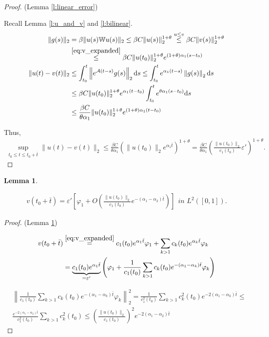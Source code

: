 \documentclass{article}
\renewcommand{\d}{\mathrm{d}}
\newcommand{\W}{\mathbb{W}}
\newcommand{\1}[1]{{\mathds{1}}_{\left\{#1\right\}}}
\newtheorem{lemma}{Lemma}
\begin{document}
\begin{proof}(Lemma \ref{l:linear_error})
	
	Recall Lemma \ref{l:u_and_v} and \ref{l:bilinear}.
	\begin{align}
		\nonumber
		\|g(s) \|_2&=\beta \|u(s) \W u(s) \|_2 \leq \beta C \| u(s)\|_2^{1+\theta} \overset{u \leq v}{\leq} \beta C \| v(s)\|_2^{1+\theta} \\
		\nonumber
		&\overset{\eqref{eq:v_expanded}}{\leq} \beta C \| u(t_0)\|_2^{1+\theta}e^{ (1+\theta)\alpha_1(s-t_0)}\\
		\nonumber
		\|u(t)-v(t) \|_2 &\leq \int_{t_0}^{t} \left\|e^{\mathcal{A}(t-s)}g(s)  \right\|_2 \d s \leq \int_{t_0}^{t}e^{\alpha_1(t-s)} \left\|g(s)  \right\|_2 \d s \\
		\nonumber
		& \leq \beta C \| u(t_0)\|_2^{1+\theta}e^{\alpha_1(t-t_0)}\int_{t_0}^{t}e^{\theta \alpha_1(s-t_0)}  \d s \\
		\label{eq:linear_error2}
		& \leq \frac{\beta C}{\theta \alpha_1} \| u(t_0)\|_{2}^{1+\theta}e^{(1+\theta)\alpha_1(t-t_0)}
	\end{align}

	Thus,
	\begin{align*}
		\sup_{t_0 \leq t \leq t_0+\bar{t}}\|u(t)-v(t) \|_2 \leq \frac{\beta C}{\theta \alpha_1} \left(\| u(t_0)\|_2e^{\alpha_1\bar{t}} \right)^{1+\theta}=\frac{\beta C}{\theta \alpha_1} \left(\frac{\| u(t_0)\|_2}{c_1(t_0)} \varepsilon' \right)^{1+\theta}.
	\end{align*}	
\end{proof}


\begin{lemma}
\label{l:leading_term}

\begin{align}
\label{eq:leading_term}
v(t_0+ \bar{t})=\varepsilon' \left[\varphi_1+O  \left(\frac{\|u(t_0) \|_2}{c_1(t_0)}  e^{-(\alpha_1-\alpha_2) \bar{t}}\right) \right] \ \ \textit{in } L^2([0,1]).
\end{align}
\end{lemma}

\begin{proof}(Lemma \ref{l:leading_term})
	
	\begin{align*}
		v(t_0+\bar{t}) &\overset{\eqref{eq:v_expanded}}{=}c_1(t_0)e^{\alpha_1\bar{t}}\varphi_1+\sum_{k>1}c_k(t_0)e^{\alpha_k \bar{t}}\varphi_k\\
		&=\underbrace{c_1(t_0)e^{\alpha_1\bar{t}}}_{=\varepsilon'}\left(\varphi_1+\frac{1}{c_1(t_0)}\sum_{k>1}c_k(t_0)e^{-(\alpha_1-\alpha_k) \bar{t}}\varphi_k \right)
	\end{align*}	
	
	\begin{align*}
		&\left \|\frac{1}{c_1(t_0)}\sum_{k>1}c_k(t_0)e^{-(\alpha_1-\alpha_k) \bar{t}}\varphi_k \right \|_2^2  = \frac{1}{c_1^2(t_0)}\sum_{k>1}c_k^2(t_0)e^{-2(\alpha_1-\alpha_k) \bar{t}}\leq \\
		& \frac{e^{-2(\alpha_1-\alpha_2) \bar{t}}}{c_1^2(t_0)}\sum_{k>1}c_k^2(t_0) \leq \left(\frac{\| u(t_0)\|_2}{c_1(t_0)} \right)^2e^{-2(\alpha_1-\alpha_2) \bar{t}}
	\end{align*}
\end{proof}
\end{document}
